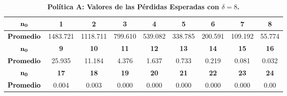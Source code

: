 \begin{table}[h!]\small
\centering
\caption{\bf Pol\'itica A: Valores de las P\'erdidas Esperadas con $\delta=8$.}\label{c33333}
\vspace{0.3 cm}\begin{tabular}{ccccccccc}
\toprule[0.6mm]
$\bf{n_0}$&\bf{1} &                   \bf{2} &                   \bf{3} &                   \bf{ 4 }&                    \bf{ 5}&              \bf{ 6} &               \bf{ 7} & \bf{8} \\
\hline
$\mbox{\bf Promedio}$&1483.721 &1118.711  &799.610  &539.082 & 338.785  &200.591  &109.192  & 55.774 \\
\hline
$\bf{n_0}$&\bf{9} &                \bf{ 10}&              \bf{      11} &                   \bf{ 12} &               \bf{      13}&              \bf{14} &  \bf{ 15} & \bf{16 }   \\
\hline
$\mbox{\bf Promedio}$&	   25.935  & 11.184  &  4.376  &  1.637   & 0.733   & 0.219   & 0.081  &  0.032  \\
	 \hline
	
$\bf{n_0}$&\bf{17} &     \bf{ 18}&   \bf{19}&   \bf{ 20} &           \bf{   21}&                \bf{  22}  & \bf{23} & \bf{24}  \\
\hline
$\mbox{\bf Promedio}$&   0.004 &   0.003&    0.000 &   0.000   & 0.000  &  0.000 &   0.000 & 0.00\\
\toprule[0.6mm]
\end{tabular}

\end{table}


